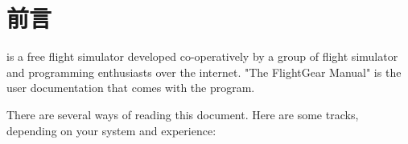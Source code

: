 
\chapter{前言}
\label{preface}

\FlightGear{} is a free flight simulator developed co-operatively by a group of flight
simulator and programming enthusiasts over the internet. "The
FlightGear Manual" is the user documentation that comes with the
program.

There are several ways of reading this document. Here are some tracks, depending on your
system and experience:







